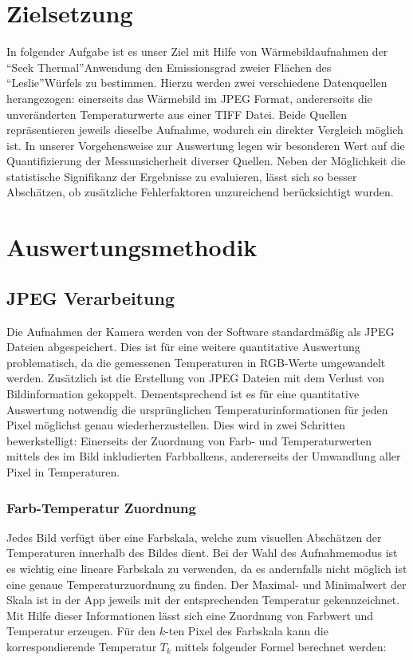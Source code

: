 \documentclass{article}
\begin{document}
\section{Zielsetzung}
In folgender Aufgabe ist es unser Ziel mit Hilfe von Wärmebildaufnahmen der \textquotedblleft Seek Thermal\textquotedblright Anwendung den Emissionsgrad zweier Flächen des \textquotedblleft Leslie\textquotedblright Würfels zu bestimmen.
Hierzu werden zwei verschiedene Datenquellen herangezogen: einerseits das Wärmebild im JPEG Format, andererseits die unveränderten Temperaturwerte aus einer TIFF Datei.
Beide Quellen repräsentieren jeweils dieselbe Aufnahme, wodurch ein direkter Vergleich möglich ist.
In unserer Vorgehensweise zur Auswertung legen wir besonderen Wert auf die Quantifizierung der Messunsicherheit diverser Quellen.
Neben der Möglichkeit die statistische Signifikanz der Ergebnisse zu evaluieren, lässt sich so besser Abschätzen, ob zusätzliche Fehlerfaktoren unzureichend berücksichtigt wurden.

\section{Auswertungsmethodik}
\subsection{JPEG Verarbeitung}
Die Aufnahmen der Kamera werden von der Software standardmäßig als JPEG Dateien abgespeichert.
Dies ist für eine weitere quantitative Auswertung problematisch, da die gemessenen Temperaturen in RGB-Werte umgewandelt werden.
Zusätzlich ist die Erstellung von JPEG Dateien mit dem Verlust von Bildinformation gekoppelt. 
Dementsprechend ist es für eine quantitative Auswertung notwendig die ursprünglichen Temperaturinformationen für jeden Pixel möglichst genau wiederherzustellen.
Dies wird in zwei Schritten bewerkstelligt:
Einerseits der Zuordnung von Farb- und Temperaturwerten mittels des im Bild inkludierten Farbbalkens, andererseits der Umwandlung aller Pixel in Temperaturen.

\subsubsection{Farb-Temperatur Zuordnung}

Jedes Bild verfügt über eine Farbskala, welche zum visuellen Abschätzen der Temperaturen innerhalb des Bildes dient.
Bei der Wahl des Aufnahmemodus ist es wichtig eine lineare Farbskala zu verwenden, da es andernfalls nicht möglich ist eine genaue Temperaturzuordnung zu finden.
Der Maximal- und Minimalwert der Skala ist in der App jeweils mit der entsprechenden Temperatur gekennzeichnet.
Mit Hilfe dieser Informationen lässt sich eine Zuordnung von Farbwert und Temperatur erzeugen.
Für den $k$-ten Pixel des Farbskala kann die korrespondierende Temperatur $T_{k}$ mittels folgender Formel berechnet werden:
\end{document}
